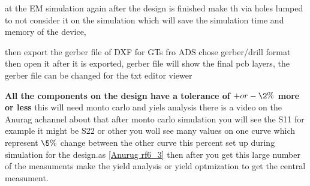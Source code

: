 \documentclass{article}
\begin{document}
\begin{itemize}
at the EM simulation again after the design is finished make th via holes lumped to not consider it on the simulation which will save the simulation time and memory of the device,


then export the gerber file of DXF for GTs fro ADS  chose gerber/drill format then open it after it is exported, 
gerber file will show the final pcb layers, 
the gerber file can be changed for the txt editor viewer 































\textbf{All the components on the design have a tolerance of  $+ or - \2\%$  more or less }
this will need monto carlo and yiels analysis  there is a video on the Anurag achannel about that after monto carlo simulation you will  see the S11 for example it might be S22 or other  you woll see many values on one  curve  which represent  $ \5\%$ change between the other curve this percent set up during simulation for the design.as \cref{Anurug rf6_3}
then after you get this large number of the measuments make the yield analysis or yield optmization to get the central measument.








































































\end{itemize}
\end{document}
